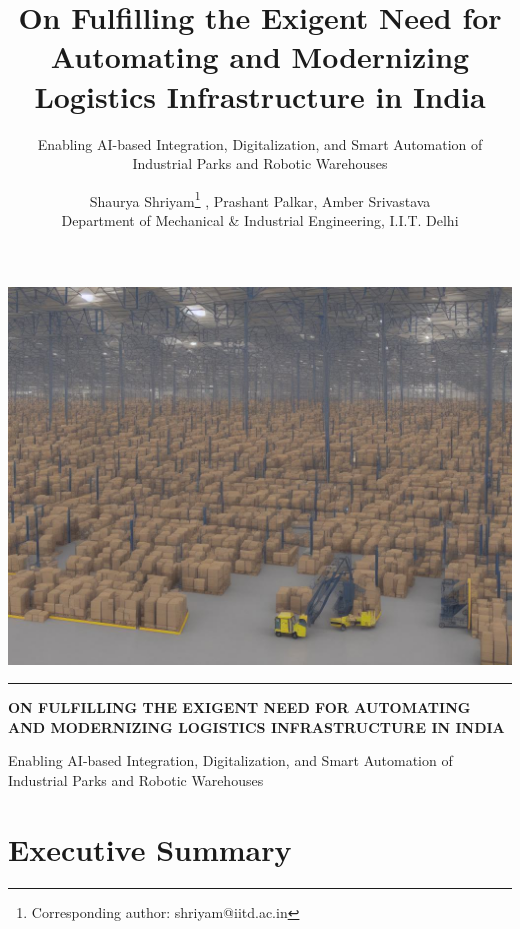 \documentclass[paper=a4wide, fontsize=12pt]{scrartcl}
\title{\vspace{-1.8cm}\color{DarkRed} On Fulfilling the Exigent Need for Automating and Modernizing Logistics Infrastructure in India}
\subtitle{Enabling AI-based Integration, Digitalization, and Smart Automation of Industrial Parks and Robotic Warehouses
}
\author{Shaurya Shriyam\footnote{Corresponding author: shriyam@iitd.ac.in} , Prashant Palkar, Amber Srivastava \\ Department of Mechanical \& Industrial Engineering, I.I.T. Delhi
\vspace{-2cm} }
\date{}
\begin{document}
\begin{titlepage}
\centering

\includegraphics[width=17cm]{nlpcover.jpg}
\noindent\textcolor{Goldenrod}{\rule{17cm}{1mm}}
\vspace{0.5cm}
\begin{spacing}{1.75}
{\justify \bfseries \Huge ON FULFILLING THE EXIGENT NEED FOR AUTOMATING AND MODERNIZING LOGISTICS INFRASTRUCTURE IN INDIA}
\end{spacing}
\vspace{0.2cm}
\begin{spacing}{1.5}
{\Large
Enabling AI-based Integration, Digitalization, and Smart Automation of Industrial Parks and Robotic Warehouses}
\end{spacing}

\end{titlepage}


\maketitle


\vspace{0.5cm}

\section{Executive Summary}
\end{document}
